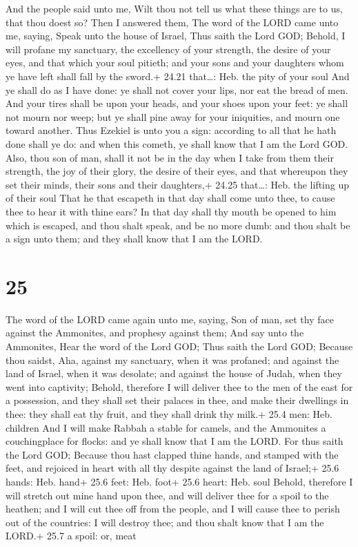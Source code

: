  And the people said unto me, Wilt thou not tell us what
these things are to us, that thou doest so?  Then I
answered them, The word of the LORD came unto me, saying, 
Speak unto the house of Israel, Thus saith the Lord GOD; Behold, I will
profane my sanctuary, the excellency of your strength, the desire of
your eyes, and that which your soul pitieth; and your sons and your
daughters whom ye have left shall fall by the sword.+ 24.21 that\ldots:
Heb. the pity of your soul  And ye shall do as I have done:
ye shall not cover your lips, nor eat the bread of men. 
And your tires shall be upon your heads, and your shoes upon your feet:
ye shall not mourn nor weep; but ye shall pine away for your iniquities,
and mourn one toward another.  Thus Ezekiel is unto you a
sign: according to all that he hath done shall ye do: and when this
cometh, ye shall know that I am the Lord GOD.  Also, thou
son of man, shall it not be in the day when I take from them their
strength, the joy of their glory, the desire of their eyes, and that
whereupon they set their minds, their sons and their daughters,+ 24.25
that\ldots: Heb. the lifting up of their soul  That he that
escapeth in that day shall come unto thee, to cause thee to hear it with
thine ears?  In that day shall thy mouth be opened to him
which is escaped, and thou shalt speak, and be no more dumb: and thou
shalt be a sign unto them; and they shall know that I am the LORD.

\hypertarget{section-24}{%
\section{25}\label{section-24}}

 The word of the LORD came again unto me, saying,
 Son of man, set thy face against the Ammonites, and
prophesy against them;  And say unto the Ammonites, Hear the
word of the Lord GOD; Thus saith the Lord GOD; Because thou saidst, Aha,
against my sanctuary, when it was profaned; and against the land of
Israel, when it was desolate; and against the house of Judah, when they
went into captivity;  Behold, therefore I will deliver thee
to the men of the east for a possession, and they shall set their
palaces in thee, and make their dwellings in thee: they shall eat thy
fruit, and they shall drink thy milk.+ 25.4 men: Heb. children
 And I will make Rabbah a stable for camels, and the
Ammonites a couchingplace for flocks: and ye shall know that I am the
LORD.  For thus saith the Lord GOD; Because thou hast
clapped thine hands, and stamped with the feet, and rejoiced in heart
with all thy despite against the land of Israel;+ 25.6 hands: Heb. hand+
25.6 feet: Heb. foot+ 25.6 heart: Heb. soul  Behold,
therefore I will stretch out mine hand upon thee, and will deliver thee
for a spoil to the heathen; and I will cut thee off from the people, and
I will cause thee to perish out of the countries: I will destroy thee;
and thou shalt know that I am the LORD.+ 25.7 a spoil: or, meat

